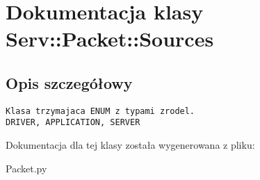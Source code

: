 \hypertarget{class_serv_1_1_packet_1_1_sources}{
\section{Dokumentacja klasy Serv::Packet::Sources}
\label{class_serv_1_1_packet_1_1_sources}
}


\subsection{Opis szczegółowy}


\footnotesize\begin{verbatim}Klasa trzymajaca ENUM z typami zrodel.
DRIVER, APPLICATION, SERVER
\end{verbatim}
\normalsize
 

Dokumentacja dla tej klasy została wygenerowana z pliku:\begin{CompactItemize}
\item 
Packet.py\end{CompactItemize}
